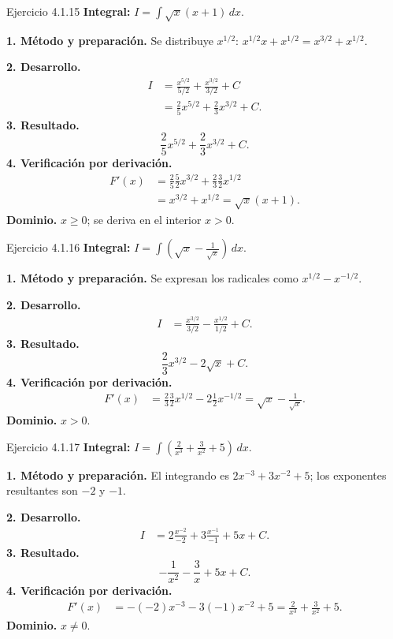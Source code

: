 \begin{examplebox}{Ejercicio 4.1.15}
\textbf{Integral:} $\displaystyle I=\int \sqrt x(x+1)\,dx$.

\textbf{1. Método y preparación.} Se distribuye $x^{1/2}$: $x^{1/2}x+x^{1/2}=x^{3/2}+x^{1/2}$.

\textbf{2. Desarrollo.}
\begin{align*}
I&=\frac{x^{5/2}}{5/2}+\frac{x^{3/2}}{3/2}+C\\&=\frac25x^{5/2}+\frac23x^{3/2}+C.
\end{align*}
\textbf{3. Resultado.}
\[
\frac25x^{5/2}+\frac23x^{3/2}+C.
\]
\textbf{4. Verificación por derivación.}
\begin{align*}
F'(x)&=\frac25\frac52x^{3/2}+\frac23\frac32x^{1/2}\\&=x^{3/2}+x^{1/2}=\sqrt x(x+1).
\end{align*}
\textbf{Dominio.} $x\ge0$; se deriva en el interior $x>0$.
\end{examplebox}

\begin{examplebox}{Ejercicio 4.1.16}
\textbf{Integral:} $\displaystyle I=\int \left(\sqrt x-\frac1{\sqrt x}\right)\,dx$.

\textbf{1. Método y preparación.} Se expresan los radicales como $x^{1/2}-x^{-1/2}$.

\textbf{2. Desarrollo.}
\begin{align*}
I&=\frac{x^{3/2}}{3/2}-\frac{x^{1/2}}{1/2}+C.
\end{align*}
\textbf{3. Resultado.}
\[
\frac23x^{3/2}-2\sqrt x+C.
\]
\textbf{4. Verificación por derivación.}
\begin{align*}
F'(x)&=\frac23\frac32x^{1/2}-2\frac12x^{-1/2}=\sqrt x-\frac1{\sqrt x}.
\end{align*}
\textbf{Dominio.} $x>0$.
\end{examplebox}

\begin{examplebox}{Ejercicio 4.1.17}
\textbf{Integral:} $\displaystyle I=\int \left(\frac2{x^3}+\frac3{x^2}+5\right)\,dx$.

\textbf{1. Método y preparación.} El integrando es $2x^{-3}+3x^{-2}+5$; los exponentes resultantes son $-2$ y $-1$.

\textbf{2. Desarrollo.}
\begin{align*}
I&=2\frac{x^{-2}}{-2}+3\frac{x^{-1}}{-1}+5x+C.
\end{align*}
\textbf{3. Resultado.}
\[
-\frac1{x^2}-\frac3x+5x+C.
\]
\textbf{4. Verificación por derivación.}
\begin{align*}
F'(x)&=-(-2)x^{-3}-3(-1)x^{-2}+5=\frac2{x^3}+\frac3{x^2}+5.
\end{align*}
\textbf{Dominio.} $x\ne0$.
\end{examplebox}

